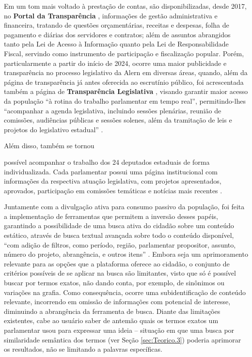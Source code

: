 Em um tom mais voltado à prestação de contas, são disponibilizadas, desde 2017, no \textbf{Portal da Transparência} \cite{ALERN:3}, informações de gestão administrativa e financeira, tratando de questões orçamentárias, receitas e despesas, folha de pagamento e diárias dos servidores e contratos; além de assuntos abrangidos tanto pela Lei de Acesso à Informação quanto pela Lei de Responsabilidade Fiscal, servindo como instrumento de participação e fiscalização popular. Porém, particularmente a partir do início de 2024, ocorre uma maior publicidade e transparência no processo legislativo da \ac{Alern} em diversas áreas, quando, além da página de transparência já antes oferecida ao escrutínio público, foi acrescentada também a página de \textbf{Transparência Legislativa} \cite{ALERN:5}, visando garantir maior acesso da população ``à rotina do trabalho parlamentar em tempo real'', permitindo-lhes ``acompanhar a agenda legislativa, incluindo sessões plenárias, reunião de comissões, audiências públicas e sessões solenes, além da tramitação de leis e projetos do legislativo estadual'' \cite{ALERN:2}.

Além disso, também se tornou

 \begin{citacao}
 possível acompanhar o trabalho dos 24 deputados estaduais de forma individualizada. Cada parlamentar possui uma página institucional com informações da respectiva atuação legislativa, com projetos apresentados, aprovados, participação em comissões temáticas e notícias mais recentes \cite{ALERN:2}.
 \end{citacao}

Juntamente com a divulgação ativa para consumo passivo da população, foi feita a implementação de ferramentas que permitem a inversão desses papéis, garantindo a possibilidade de uma busca ativa do cidadão sobre um conteúdo estático, através de busca textual avançada sobre todo o conteúdo disponível, ``com adição de filtros, como período, região, parlamentar propositor, assunto, número do projeto, abrangência, e outros itens'' \cite{ALERN:2}. Embora seja um aprimoramento relevante para as opções que a plataforma oferece ao cidadão, o conjunto de critérios possíveis de se aplicar na busca são limitantes, visto que só é possível buscar por termos exatos, não dando conta, por exemplo, de sinônimos ou variações na grafia. Como consequência, ocorre uma subidentificação de conteúdo relevante, incorrendo em omissão de informações com potencial de interesse, diminuindo a abrangência da ferramenta de busca. Diante das limitações existentes, cabe ao usuário saber de antemão quais os termos exatos um parlamentar usou para expressar uma ideia -- situação em que uma busca por similaridade semântica dos termos (ver Seção \ref{sec:Teorico.3}) poderia aprimorar os resultados, não se limitando a palavras específicas.

